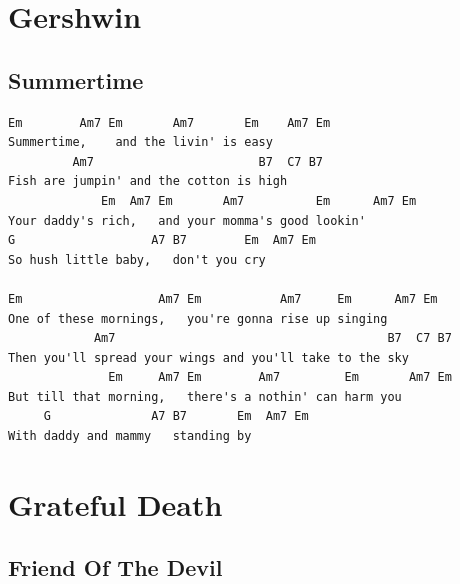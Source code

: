 \documentclass[a4paper]{article}
\begin{document}
\section{Gershwin} %
\label{sec:Gershwin}
\subsection{Summertime} %
\label{sub:Summertime}
\begin{Verbatim}[commandchars=\\\{\}]
Em        Am7 Em       Am7       Em    Am7 Em
Summertime,    and the livin' is easy
         Am7                       B7  C7 B7
Fish are jumpin' and the cotton is high
             Em  Am7 Em       Am7          Em      Am7 Em
Your daddy's rich,   and your momma's good lookin'
G                   A7 B7        Em  Am7 Em
So hush little baby,   don't you cry

Em                   Am7 Em           Am7     Em      Am7 Em
One of these mornings,   you're gonna rise up singing
            Am7                                      B7  C7 B7
Then you'll spread your wings and you'll take to the sky
              Em     Am7 Em        Am7         Em       Am7 Em
But till that morning,   there's a nothin' can harm you
     G              A7 B7       Em  Am7 Em
With daddy and mammy   standing by
\end{Verbatim}
\newpage
\section{Grateful Death} %
\label{sec:Grateful Death}
\subsection{Friend Of The Devil} %
\label{sub:Friend Of The Devil}
\end{document}
